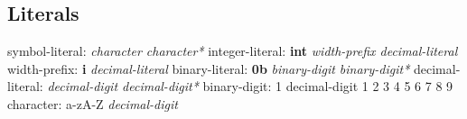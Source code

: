 \subsection{Literals}  
symbol-literal:\newline
\indent \textit{character character*}\newline
integer-literal:\newline
\indent \textbf{int} \textit{width-prefix decimal-literal}\newline
width-prefix:\newline
\indent \textbf{i} \textit{decimal-literal}\newline
binary-literal:\newline
\indent \textbf{0b} \textit{binary-digit binary-digit*}\newline
decimal-literal:\newline
\indent \textit{decimal-digit decimal-digit*}\newline
binary-digit:\newline
{} 1\newline
decimal-digit\newline
{} 1 2 3 4 5 6 7 8 9\newline
character:\newline
\indent a-zA-Z \textit{decimal-digit}\newline
